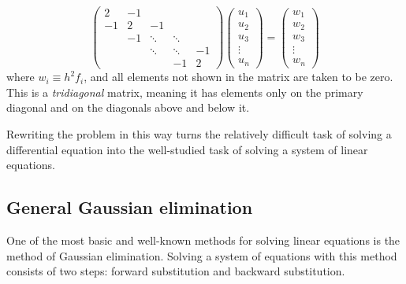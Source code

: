 \documentclass{article}
\begin{document}
        \begin{equation}
            \begin{pmatrix}
                 2 & -1 &        &        &    \\
                -1 &  2 & -1     &        &    \\
                   & -1 & \ddots & \ddots &    \\
                   &    & \ddots & \ddots & -1 \\
                   &    &        & -1     &  2
            \end{pmatrix}
            \begin{pmatrix}
                u_1 \\ u_2 \\ u_3 \\ \vdots \\ u_n
            \end{pmatrix}
            =
            \begin{pmatrix}
                w_1 \\ w_2 \\ w_3 \\ \vdots \\ w_n
            \end{pmatrix}
            \label{eq:oursystem}
        \end{equation}
        where $w_i \equiv h^2 f_i$, and all elements not shown in the matrix are taken to be zero. This is a \emph{tridiagonal} matrix, meaning it has elements only on the primary diagonal and on the diagonals above and below it.

        Rewriting the problem in this way turns the relatively difficult task of solving a differential equation into the well-studied task of solving a system of linear equations.

    \subsection{General Gaussian elimination}

        One of the most basic and well-known methods for solving linear equations is the method of Gaussian elimination. Solving a system of equations with this method consists of two steps: forward substitution and backward substitution.
\end{document}
